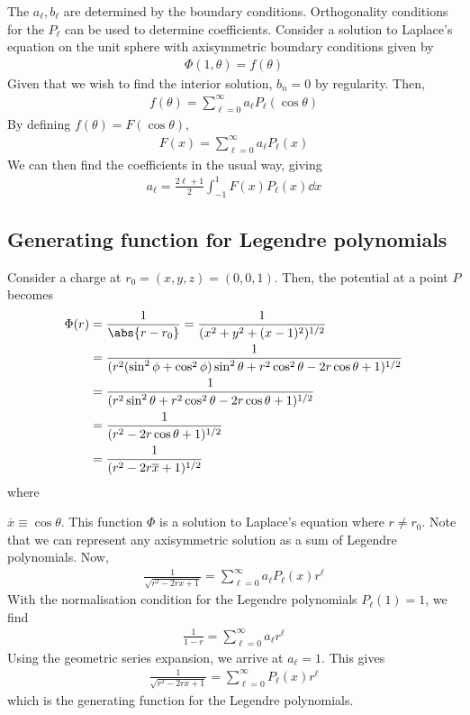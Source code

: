 The $a_\ell, b_\ell$ are determined by the boundary conditions.
Orthogonality conditions for the $P_\ell$ can be used to determine coefficients.
Consider a solution to Laplace's equation on the unit sphere with axisymmetric boundary conditions given by
\begin{align*}
	\Phi(1,\theta) = f(\theta)
\end{align*}
Given that we wish to find the interior solution, $b_n = 0$ by regularity.
Then,
\begin{align*}
	f(\theta) = \sum_{\ell=0}^\infty a_\ell P_\ell(\cos\theta)
\end{align*}
By defining $f(\theta) = F(\cos\theta)$,
\begin{align*}
	F(x) = \sum_{\ell=0}^\infty a_\ell P_\ell(x)
\end{align*}
We can then find the coefficients in the usual way, giving
\begin{align*}
	a_\ell = \frac{2\ell + 1}{2} \int_{-1}^1 F(x) P_{\ell}(x) \dd{x}
\end{align*}

\subsection{Generating function for Legendre polynomials}
Consider a charge at $r_0 = (x,y,z) = (0,0,1)$.
Then, the potential at a point $P$ becomes
\begin{align*}
	\Phi(r) & = \frac{1}{\abs{r - r_0}} = \frac{1}{(x^2 + y^2 + (x-1)^2)^{1/2}} \\
	& = \frac{1}{(r^2 (\sin^2 \phi + \cos^2 \phi) \sin^2 \theta + r^2 \cos^2 \theta - 2r \cos\theta + 1)^{1/2}} \\
	& = \frac{1}{(r^2 \sin^2 \theta + r^2 \cos^2 \theta - 2r \cos\theta + 1)^{1/2}} \\
	& = \frac{1}{(r^2 - 2r \cos\theta + 1)^{1/2}} \\
	& = \frac{1}{(r^2 - 2r \overline x + 1)^{1/2}}
\end{align*}
where 

$\overline x \equiv \cos \theta$.
This function $\Phi$ is a solution to Laplace's equation where $r \neq r_0$.
Note that we can represent any axisymmetric solution as a sum of Legendre polynomials.
Now,
\begin{align*}
	\frac{1}{\sqrt{r^2 - 2rx + 1}} = \sum_{\ell = 0}^\infty a_\ell P_\ell(x) r^\ell
\end{align*}
With the normalisation condition for the Legendre polynomials $P_\ell(1) = 1$, we find
\begin{align*}
	\frac{1}{1-r} = \sum_{\ell=0}^\infty a_\ell r^\ell
\end{align*}
Using the geometric series expansion, we arrive at $a_\ell = 1$.
This gives
\begin{align*}
	\frac{1}{\sqrt{r^2 - 2rx + 1}} = \sum_{\ell = 0}^\infty P_\ell(x) r^\ell
\end{align*}
which is the generating function for the Legendre polynomials.